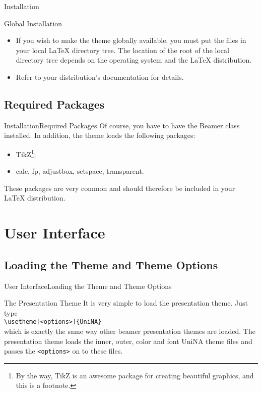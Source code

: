 \documentclass[10pt,aspectratio=43
	]{beamer}
\begin{document}
	\begin{frame}{Installation}
	\begin{block}{Global Installation}
	\begin{itemize}
		\item If you wish to make the theme globally available, you must put the files in your local LaTeX directory tree.
		The location of the root of the local directory tree depends on the operating system and the LaTeX distribution.
		\item Refer to your distribution's documentation for details.
	\end{itemize}
	\end{block}
	\end{frame}

\subsection{Required Packages}
\begin{frame}{Installation}{Required Packages}
  Of course, you have to have the Beamer class installed. In addition, the theme loads the following packages:
  \begin{itemize}
	\item TikZ\footnote[frame]{By the way, TikZ is an awesome package for creating beautiful graphics, and this is a footnote.};
    \item calc, fp, adjustbox, setspace, transparent.
  \end{itemize}
  These packages are very common and should therefore be included in your LaTeX distribution.
\end{frame}

\section{User Interface}
\subsection{Loading the Theme and Theme Options}
\begin{frame}{User Interface}{Loading the Theme and Theme Options}
  \begin{block}{The Presentation Theme}
    It is very simple to load the presentation theme. Just type\\
    {\tt \textbackslash usetheme[<options>]\{UniNA\}}\\
	which is exactly the same way other beamer presentation themes are loaded. 
	The presentation theme loads the inner, outer, color and font UniNA theme files 
	and passes the {\tt <options>} on to these files.
  \end{block}
\end{frame}
\end{document}
